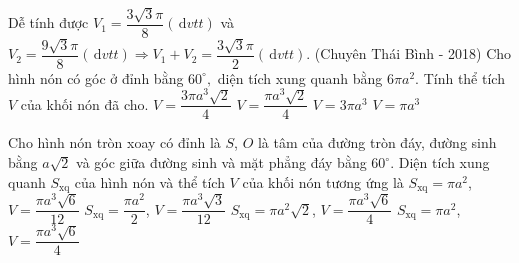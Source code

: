 \begin{ex}
	Dễ tính được $V_1=\dfrac{3\sqrt{3}\pi}{8}(\mathrm{\,d}vtt)$ và $V_2=\dfrac{9\sqrt{3}\pi}{8}(\mathrm{\,d}vtt)\Rightarrow V_1+V_2=\dfrac{3\sqrt{3}\pi}{2}(\mathrm{\,d}vtt)$. (Chuyên Thái Bình - 2018) Cho hình nón có góc ở đỉnh bằng $60^{\circ},$ diện tích xung quanh bằng $6\pi a^2$. Tính thể tích $V$ của khối nón đã cho. 
	\choice
	{$V=\dfrac{3\pi a^3\sqrt{2}}{4}$}
	{$V=\dfrac{\pi a^3\sqrt{2}}{4}$}
	{\True $V=3\pi a^3$}
	{$V=\pi a^3$}
\end{ex}
\begin{ex}
	Cho hình nón tròn xoay có đỉnh là $S$, $O$ là tâm của đường tròn đáy, đường sinh bằng $a\sqrt{2}$ và góc giữa đường sinh và mặt phẳng đáy bằng $60^{\circ}$. Diện tích xung quanh $S_{\mathrm{xq}}$ của hình nón và thể tích $V$ của khối nón tương ứng là
	\choice
	{\True $S_{\mathrm{xq}}=\pi a^2$, $V=\dfrac{\pi a^3\sqrt{6}}{12}$}
	{$S_{\mathrm{xq}}=\dfrac{\pi a^2}{2}$, $V=\dfrac{\pi a^3\sqrt{3}}{12}$}
	{$S_{\mathrm{xq}}=\pi a^2\sqrt{2}$, $V=\dfrac{\pi a^3\sqrt{6}}{4}$}
	{$S_{\mathrm{xq}}=\pi a^2$, $V=\dfrac{\pi a^3\sqrt{6}}{4}$}
\end{ex}
